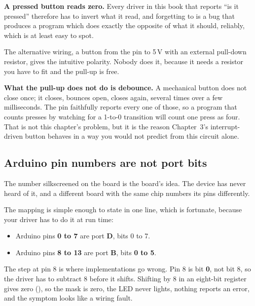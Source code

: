 \textbf{A pressed button reads zero.} Every driver in this book that reports ``is it pressed''
therefore has to invert what it read, and forgetting to is a bug that produces a program which does
exactly the opposite of what it should, reliably, which is at least easy to spot.

The alternative wiring, a button from the pin to 5\,V with an external pull-down resistor, gives
the intuitive polarity. Nobody does it, because it needs a resistor you have to fit and the
pull-up is free.

\textbf{What the pull-up does not do is debounce.} A mechanical button does not close once; it
closes, bounces open, closes again, several times over a few milliseconds. The pin faithfully
reports every one of those, so a program that counts presses by watching for a 1-to-0 transition
will count one press as four. That is not this chapter's problem, but it is the reason
Chapter~3's interrupt-driven button behaves in a way you would not predict from this circuit alone.

\subsection{Arduino pin numbers are not port bits}
\label{c2:sec:pinmap}


The number silkscreened on the board is the board's idea. The device has never heard of it, and a
different board with the same chip numbers its pins differently.

The mapping is simple enough to state in one line, which is fortunate, because your driver has to
do it at run time:
\begin{itemize}
  \item Arduino pins \textbf{0 to 7} are port \textbf{D}, bits 0 to 7.
  \item Arduino pins \textbf{8 to 13} are port \textbf{B}, bits \textbf{0 to 5}.
\end{itemize}

The step at pin 8 is where implementations go wrong. Pin 8 is bit \textbf{0}, not bit 8, so the
driver has to subtract 8 before it shifts. Shifting by 8 in an eight-bit register gives zero
(), so the mask is zero, the LED never lights, nothing reports an error,
and the symptom looks like a wiring fault.

